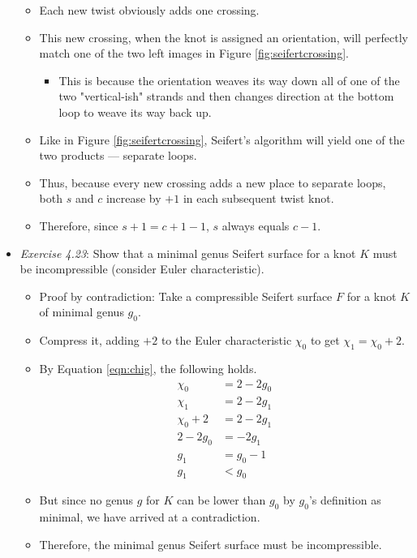 \documentclass[titlepage]{article}
\numberwithin{figure}{section}
\numberwithin{table}{section}
\numberwithin{equation}{section}
\begin{document}
\begin{itemize}
\begin{itemize}
        \item Each new twist obviously adds one crossing.
        \item This new crossing, when the knot is assigned an orientation, will perfectly match one of the two left images in Figure \ref{fig:seifertcrossing}.
        \begin{itemize}
            \item This is because the orientation weaves its way down all of one of the two "vertical-ish" strands and then changes direction at the bottom loop to weave its way back up.
        \end{itemize}
        \item Like in Figure \ref{fig:seifertcrossing}, Seifert's algorithm will yield one of the two products --- separate loops.
        \item Thus, because every new crossing adds a new place to separate loops, both $s$ and $c$ increase by $+1$ in each subsequent twist knot.
        \item Therefore, since $s+1=c+1-1$, $s$ always equals $c-1$.
    \end{itemize}
    \item \emph{Exercise 4.23}: Show that a minimal genus Seifert surface for a knot $K$ must be incompressible (consider Euler characteristic).
    \begin{itemize}
        \item Proof by contradiction: Take a compressible Seifert surface $F$ for a knot $K$ of minimal genus $g_0$.
        \item Compress it, adding $+2$ to the Euler characteristic $\chi_0$ to get $\chi_1=\chi_0+2$.
        \item By Equation \ref{eqn:chig}, the following holds.
        \begin{align*}
            \chi_0 &=2-2g_0\\
            \chi_1 &=2-2g_1\\
            \chi_0+2 &=2-2g_1\\
            2-2g_0 &=-2g_1\\
            g_1 &=g_0-1\\
            g_1 &<g_0
        \end{align*}
        \item But since no genus $g$ for $K$ can be lower than $g_0$ by $g_0$'s definition as minimal, we have arrived at a contradiction.
        \item Therefore, the minimal genus Seifert surface must be incompressible.

\end{itemize}
\end{itemize}
\end{document}
